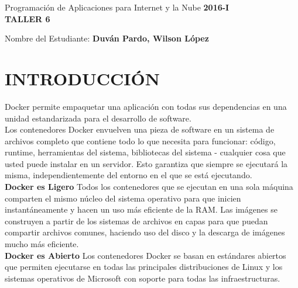 \documentclass[10pt]{article}   			%
\begin{document}
	\renewcommand{\headrulewidth}{0.5pt}

	\thispagestyle{empty}						%
	\begin{center}
		\large {Programación de Aplicaciones para Internet y la Nube
			\hspace{5 cm}\textbf{2016-I}}
		\bigskip  
		\textbf{
				\LARGE{\\TALLER 6}}\\								%
	\end{center}	
	\begin{flushright}	
		\bigskip	
		Nombre del Estudiante: \textbf{Duván Pardo, Wilson López}			%
	\end{flushright} 

\section{INTRODUCCIÓN}	
Docker permite empaquetar una aplicación con todas sus dependencias en una unidad estandarizada para el desarrollo de software.\\


Los contenedores Docker envuelven una pieza de software en un sistema de archivos completo que contiene todo lo que necesita para funcionar: código, runtime, herramientas del sistema, bibliotecas del sistema - cualquier cosa que usted puede instalar en un servidor. Esto garantiza que siempre se ejecutará la misma, independientemente del entorno en el que se está ejecutando.\\


\textbf{Docker es Ligero}
Todos los contenedores que se ejecutan en una sola máquina comparten el mismo núcleo del sistema operativo para que inicien instantáneamente y hacen un uso más eficiente de la RAM. Las imágenes se construyen a partir de los sistemas de archivos en capas para que puedan compartir archivos comunes, haciendo uso del disco y la descarga de imágenes mucho más eficiente.\\


\textbf{Docker es Abierto}
Los contenedores Docker se basan en estándares abiertos que permiten ejecutarse en todas las principales distribuciones de Linux y los sistemas operativos de Microsoft con soporte para todas las infraestructuras.\\
\end{document}

